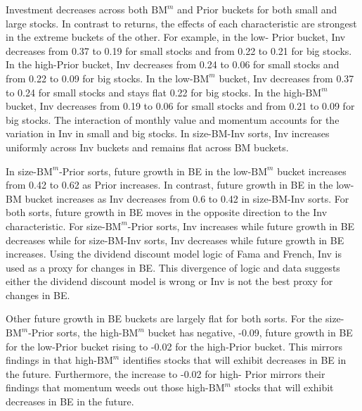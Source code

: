 Investment decreases across both $\text{BM}^m$ and Prior buckets for both small
and large stocks. In contrast to returns, the effects of each characteristic
are strongest in the extreme buckets of the other. For example, in the low-
Prior bucket, Inv decreases from 0.37 to 0.19 for small stocks and from 0.22 to
0.21 for big stocks. In the high-Prior bucket, Inv decreases from 0.24 to 0.06
for small stocks and from 0.22 to 0.09 for big stocks. In the low-$\text{BM}^m$
bucket, Inv decreases from 0.37 to 0.24 for small stocks and stays flat 0.22
for big stocks. In the high-$\text{BM}^m$ bucket, Inv decreases from 0.19 to
0.06 for small stocks and from 0.21 to 0.09 for big stocks. The interaction of
monthly value and momentum accounts for the variation in Inv in small and big
stocks. In size-BM-Inv sorts, Inv increases uniformly across Inv buckets and
remains flat across BM buckets.

In size-$\text{BM}^m$-Prior sorts, future growth in BE in the low-$\text{BM}^m$
bucket increases from 0.42 to 0.62 as Prior increases. In contrast, future
growth in BE in the low-BM bucket increases as Inv decreases from 0.6 to 0.42
in size-BM-Inv sorts. For both sorts, future growth in BE moves in the opposite
direction to the Inv characteristic. For size-$\text{BM}^m$-Prior sorts, Inv
increases while future growth in BE decreases while for size-BM-Inv sorts, Inv
decreases while future growth in BE increases. Using the dividend discount
model logic of Fama and French, Inv is used as a proxy for changes in BE. This
divergence of logic and data suggests either the dividend discount model is
wrong or Inv is not the best proxy for changes in BE.

Other future growth in BE buckets are largely flat for both sorts. For the
size-$\text{BM}^m$-Prior sorts, the high-$\text{BM}^m$ bucket has negative,
-0.09, future growth in BE for the low-Prior bucket rising to -0.02 for the
high-Prior bucket. This mirrors findings in \textcite{kok2017facts} that
high-$\text{BM}^m$ identifies stocks that will exhibit decreases in BE in the
future. Furthermore, the increase to -0.02 for high- Prior mirrors their
findings that momentum weeds out those high-$\text{BM}^m$ stocks that will
exhibit decreases in BE in the future.
